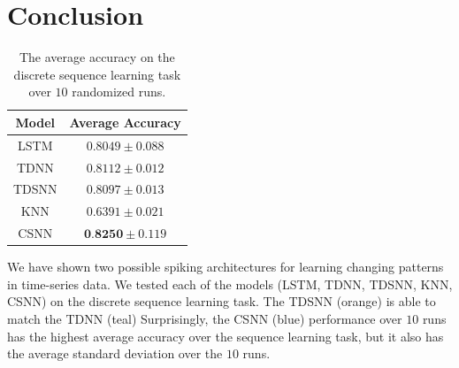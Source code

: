 \documentclass{article}
\begin{document}
\section*{Conclusion}

\begin{table}[H]
    \centering
    \begin{tabular}{|c|c|} \hline
        Model & Average Accuracy \\ \hline
        LSTM  & $0.8049 \pm 0.088$ \\ \hline
        TDNN  & $0.8112 \pm 0.012$ \\ \hline
        TDSNN & $0.8097 \pm 0.013$ \\ \hline
        KNN   & $0.6391 \pm 0.021$ \\ \hline
        CSNN  & $\textbf{0.8250} \pm 0.119$ \\ \hline
    \end{tabular}
    \caption{The average accuracy on the discrete sequence learning task over $10$ randomized runs.}
    \label{tab:meanaccuracy}
\end{table}

We have shown two possible spiking architectures for learning changing patterns in time-series data. We tested each of the models (LSTM, TDNN, TDSNN, KNN, CSNN) on the discrete sequence learning task.  The TDSNN (orange) is able to match the TDNN (teal) Surprisingly, the CSNN (blue) performance over $10$ runs has the highest average accuracy over the sequence learning task, but it also has the average standard deviation over the $10$ runs.

\printbibliography[title={References}]
\end{document}
